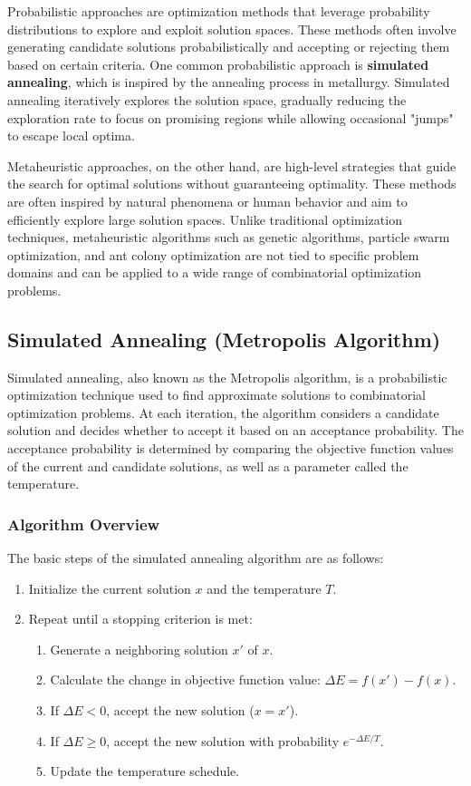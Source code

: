 \documentclass[12pt]{book} %
\begin{document}
Probabilistic approaches are optimization methods that leverage probability distributions to explore and exploit solution spaces. These methods often involve generating candidate solutions probabilistically and accepting or rejecting them based on certain criteria. One common probabilistic approach is \textbf{simulated annealing}, which is inspired by the annealing process in metallurgy. Simulated annealing iteratively explores the solution space, gradually reducing the exploration rate to focus on promising regions while allowing occasional "jumps" to escape local optima.

Metaheuristic approaches, on the other hand, are high-level strategies that guide the search for optimal solutions without guaranteeing optimality. These methods are often inspired by natural phenomena or human behavior and aim to efficiently explore large solution spaces. Unlike traditional optimization techniques, metaheuristic algorithms such as genetic algorithms, particle swarm optimization, and ant colony optimization are not tied to specific problem domains and can be applied to a wide range of combinatorial optimization problems.

\subsection{Simulated Annealing (Metropolis Algorithm)}

Simulated annealing, also known as the Metropolis algorithm, is a probabilistic optimization technique used to find approximate solutions to combinatorial optimization problems. At each iteration, the algorithm considers a candidate solution and decides whether to accept it based on an acceptance probability. The acceptance probability is determined by comparing the objective function values of the current and candidate solutions, as well as a parameter called the temperature.

\subsubsection{Algorithm Overview}

The basic steps of the simulated annealing algorithm are as follows:
\FloatBarrier
\begin{enumerate}
    \item Initialize the current solution $x$ and the temperature $T$.
    \item Repeat until a stopping criterion is met:
    \begin{enumerate}
        \item Generate a neighboring solution $x'$ of $x$.
        \item Calculate the change in objective function value: $\Delta E = f(x') - f(x)$.
        \item If $\Delta E < 0$, accept the new solution ($x = x'$).
        \item If $\Delta E \geq 0$, accept the new solution with probability $e^{-\Delta E / T}$.
        \item Update the temperature schedule.
    \end{enumerate}
\end{enumerate}
\FloatBarrier
\end{document}
